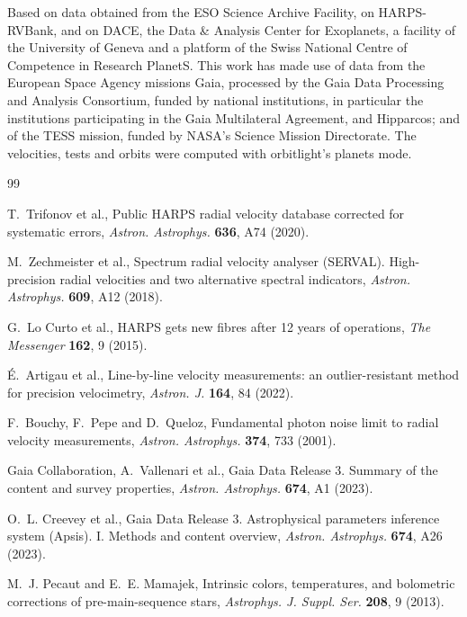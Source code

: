 \documentclass[3p,11pt]{elsarticle}
\begin{document}
Based on data obtained from the ESO Science Archive Facility, on HARPS-RVBank, and on DACE, the Data \&
Analysis Center for Exoplanets, a facility of the University of Geneva and a platform of the Swiss
National Centre of Competence in Research PlanetS. This work has made use of data from the European Space
Agency missions Gaia, processed by the Gaia Data Processing and Analysis Consortium, funded by national
institutions, in particular the institutions participating in the Gaia Multilateral Agreement, and
Hipparcos; and of the TESS mission, funded by NASA's Science Mission Directorate. The velocities, tests
and orbits were computed with orbitlight's planets mode.

\begin{thebibliography}{99}\small\raggedright
\setlength{\itemsep}{1pt}

T.~Trifonov et al., Public HARPS radial velocity database corrected for systematic errors,
\emph{Astron. Astrophys.} \textbf{636}, A74 (2020).

M.~Zechmeister et al., Spectrum radial velocity analyser (SERVAL). High-precision radial velocities and
two alternative spectral indicators, \emph{Astron. Astrophys.} \textbf{609}, A12 (2018).

G.~Lo Curto et al., HARPS gets new fibres after 12 years of operations, \emph{The Messenger}
\textbf{162}, 9 (2015).

\'E.~Artigau et al., Line-by-line velocity measurements: an outlier-resistant method for precision
velocimetry, \emph{Astron. J.} \textbf{164}, 84 (2022).

F.~Bouchy, F.~Pepe and D.~Queloz, Fundamental photon noise limit to radial velocity measurements,
\emph{Astron. Astrophys.} \textbf{374}, 733 (2001).

Gaia Collaboration, A.~Vallenari et al., Gaia Data Release 3. Summary of the content and survey
properties, \emph{Astron. Astrophys.} \textbf{674}, A1 (2023).

O.~L. Creevey et al., Gaia Data Release 3. Astrophysical parameters inference system (Apsis). I. Methods
and content overview, \emph{Astron. Astrophys.} \textbf{674}, A26 (2023).

M.~J. Pecaut and E.~E. Mamajek, Intrinsic colors, temperatures, and bolometric corrections of
pre-main-sequence stars, \emph{Astrophys. J. Suppl. Ser.} \textbf{208}, 9 (2013).


\end{thebibliography}
\end{document}
